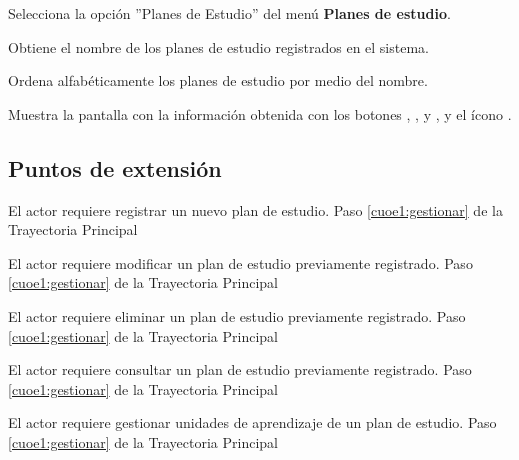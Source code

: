 \begin{UCtrayectoria}
	
	\UCpaso [\UCactor] Selecciona la opción ''Planes de Estudio'' del menú \textbf{Planes de estudio}.
	
	\UCpaso [\UCsist] Obtiene el nombre de los planes de estudio registrados en el sistema.
	
	\UCpaso [\UCsist] Ordena alfabéticamente los planes de estudio por medio del nombre.
	
	\UCpaso[\UCsist] Muestra la pantalla  con la información obtenida con los botones , ,  y , y el ícono \btnRegistrar.
	\label{cuoe1:gestionar}
\end{UCtrayectoria}


\subsection{Puntos de extensión}

\UCExtensionPoint 
{El actor requiere registrar un nuevo plan de estudio.}
{Paso \ref{cuoe1:gestionar} de la Trayectoria Principal}
{}

\UCExtensionPoint 
{El actor requiere modificar un plan de estudio previamente registrado.}
{Paso \ref{cuoe1:gestionar} de la Trayectoria Principal}
{}

\UCExtensionPoint 
{El actor requiere eliminar un plan de estudio previamente registrado.}
{Paso \ref{cuoe1:gestionar} de la Trayectoria Principal}
{}

\UCExtensionPoint 
{El actor requiere consultar un plan de estudio previamente registrado.}
{Paso \ref{cuoe1:gestionar} de la Trayectoria Principal}
{}

\UCExtensionPoint 
{El actor requiere gestionar unidades de aprendizaje de un plan de estudio.}
{Paso \ref{cuoe1:gestionar} de la Trayectoria Principal}
{}
